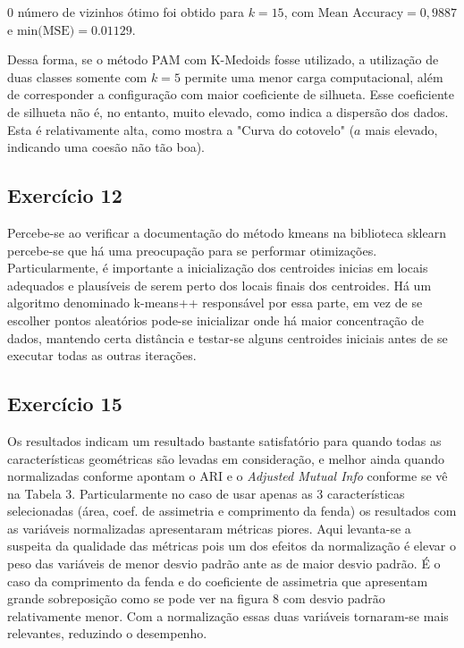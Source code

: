 0 número de vizinhos ótimo foi obtido para $k = 15$, com $\text{Mean Accuracy} = 0,9887$ e $\text{min(MSE)} = 0.01129$.

Dessa forma, se o método PAM com K-Medoids fosse utilizado, a utilização de duas classes somente com $k = 5$ permite uma menor carga computacional, além de corresponder a configuração com maior coeficiente de silhueta. Esse coeficiente de silhueta não é, no entanto, muito elevado, como indica a dispersão dos dados. Esta é relativamente alta, como mostra a "Curva do cotovelo" ($a$ mais elevado, indicando uma coesão não tão boa).

\subsection{Exercício 12}
Percebe-se ao verificar a documentação \citep{sklearn_kmeans_ref} do método kmeans na biblioteca sklearn percebe-se que há uma preocupação para se performar otimizações. Particularmente, é importante a inicialização dos centroides inicias em locais adequados e plausíveis de serem perto dos locais finais dos centroides. Há um algoritmo denominado k-means++ responsável por essa parte, em vez de se escolher pontos aleatórios pode-se inicializar onde há maior concentração de dados, mantendo certa distância e testar-se alguns centroides iniciais antes de se executar todas as outras iterações.



\subsection{Exercício 15}

Os resultados indicam um resultado bastante satisfatório para quando todas as características geométricas são levadas em consideração, e melhor ainda quando normalizadas conforme apontam o ARI e o \textit{Adjusted Mutual Info} conforme se vê na Tabela 3.
Particularmente no caso de usar apenas as 3 características selecionadas (área, coef. de assimetria e comprimento da fenda) os resultados com as variáveis normalizadas apresentaram métricas piores. Aqui levanta-se a suspeita da qualidade das métricas pois um dos efeitos da normalização é elevar o peso das variáveis de menor desvio padrão ante as de maior desvio padrão. É o caso da comprimento da fenda e do coeficiente de assimetria que apresentam grande sobreposição como se pode ver na figura 8 com desvio padrão relativamente menor. Com a normalização essas duas variáveis tornaram-se mais relevantes, reduzindo o desempenho.

